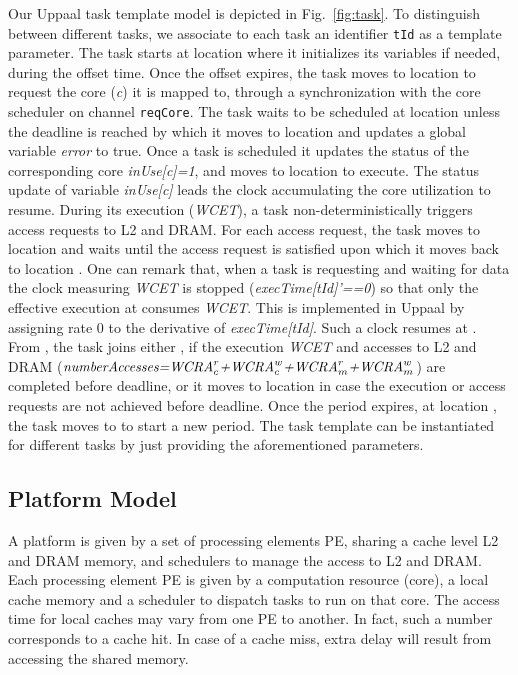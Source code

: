 Our Uppaal task template model is depicted in Fig.~\ref{fig:task}. To distinguish between different tasks, we associate to each task an identifier \texttt{tId} as a template parameter. The task starts at location  where it initializes its variables if needed, during the offset time. Once the offset expires, the task moves to location  to request the core (\emph{c}) it is mapped to, through a synchronization with the core scheduler on channel \texttt{reqCore}. The task waits to be scheduled at location  unless the deadline is reached by which it moves to location  and updates a global variable \emph{error} to true. Once a task is scheduled it updates the status of the corresponding core \emph{inUse[c]=1}, and moves to location  to execute. The status update of variable \emph{inUse[c]} leads the clock accumulating the core utilization to resume. During its execution (\emph{WCET}), a task non-deterministically triggers access requests to L2 and DRAM. For each access request, the task moves to location  and waits until the access request is satisfied upon which it moves back to location . One can remark that, when a task is requesting and waiting for data the clock measuring \emph{WCET} is stopped (\emph{execTime[tId]'==0}) so that only the effective execution at  consumes \emph{WCET}. This is implemented in Uppaal by assigning rate 0 to the derivative of \emph{execTime[tId]}. Such a clock resumes at . From , the task joins either , if the execution \emph{WCET} and accesses to L2 and DRAM ($\emph{numberAccesses=WCRA}_c^r\emph{+WCRA}_c^w \emph{+WCRA}_m^r\emph{+WCRA}_m^w$) are completed before deadline, or it moves to location  in case the execution or access requests are not achieved before deadline. Once the period expires, at location , the task moves to  to start a new period. The task template can be instantiated for different tasks by just providing the aforementioned parameters.%
  

\subsection{Platform Model}
A platform is given by a set of processing elements {\cal PE}, sharing a cache level L2 and DRAM memory, and schedulers to manage the access to L2 and DRAM. Each processing element PE is given by a computation resource (core), a local cache memory and a scheduler to dispatch tasks to run on that core. The access time for local caches may vary from one PE to another. In fact, such a number corresponds to a cache hit. In case of a cache miss, extra delay will result from accessing the shared memory. %

